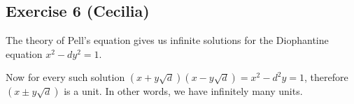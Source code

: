\subsection*{Exercise 6 (Cecilia)}
The theory of Pell's equation gives us infinite solutions for the Diophantine equation $ x^2 - dy^2 = 1 $.

Now for every such solution $ (x + y \sqrt{d})(x - y \sqrt{d}) = x^2 - d^2y = 1 $, therefore $ (x \pm y \sqrt{d}) $ is a unit. In other words, we have infinitely many units.